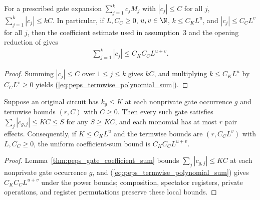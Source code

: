 \begin{lemma}
    \label{thm:peps_gate_coefficient_sum}
    \leanok
    For a prescribed gate expansion $\sum_{j=1}^{k}c_jM_j$ with $|c_j|\le C$
    for all $j$, $\sum_{j=1}^{k}|c_j|\le kC$. In particular, if $L,C_C\ge0$,
    $u,v\in\N$, $k\le C_KL^u$, and $|c_j|\le C_CL^v$ for all $j$, then the
    coefficient estimate used in assumption~3 and the opening reduction of
    \cite[Theorem~5.2]{OpenAI2026PolynomialPEPS} gives
    \begin{align}
        \sum_{j=1}^{k}|c_j|\leq C_KC_CL^{u+v}.
        \label{eq:peps_termwise_polynomial_sum}
    \end{align}
\end{lemma}
\begin{proof}
    \leanok
    Summing $|c_j|\le C$ over $1\le j\le k$ gives $kC$, and multiplying
    $k\le C_KL^u$ by $C_CL^v\ge0$ yields (\ref{eq:peps_termwise_polynomial_sum}).
\end{proof}

\begin{lemma}
    \label{thm:peps_original_coefficient_sum}
    \leanok
    Suppose an original circuit has $k_g\le K$ at each nonprivate gate
    occurrence $g$ and termwise bounds $(r,C)$ with $C\ge0$. Then every such
    gate satisfies $\sum_j|c_{g,j}|\le KC\le S$ for any $S\ge KC$, and each
    monomial has at most $r$ pair effects. Consequently, if $K\le C_KL^u$ and
    the termwise bounds are $(r,C_CL^v)$ with $L,C_C\ge0$, the uniform
    coefficient-sum bound is $C_KC_CL^{u+v}$.
\end{lemma}
\begin{proof}
    \leanok
    Lemma~\ref{thm:peps_gate_coefficient_sum} bounds $\sum_j|c_{g,j}|\le KC$
    at each nonprivate gate occurrence $g$, and (\ref{eq:peps_termwise_polynomial_sum})
    gives $C_KC_CL^{u+v}$ under the power bounds; composition, spectator
    registers, private operations, and register permutations preserve these
    local bounds.
\end{proof}
